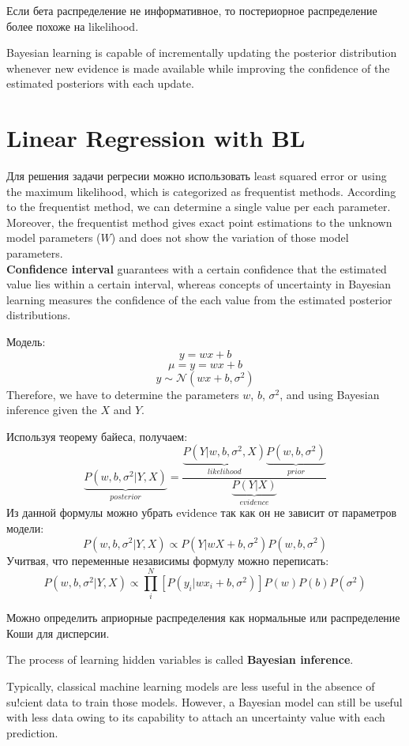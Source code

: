 \documentclass{book}
\begin{document}
Если бета распределение не информативное, то постериорное распределение более похоже на likelihood.

Bayesian learning is capable of incrementally updating the
posterior distribution whenever new evidence is made available while
improving the confidence of the estimated posteriors with each
update.

\section{Linear Regression with BL}

Для решения задачи регресии можно использовать least squared error or using the maximum likelihood, which is
categorized as frequentist methods. According to the frequentist method, we can determine a single value
per each parameter.
Moreover, the frequentist method gives exact point estimations to
the unknown model parameters ($W$) and does not show the
variation of those model parameters.\\
\textbf{Confidence interval}  guarantees with a certain confidence that the estimated value lies within a certain
interval, whereas concepts of uncertainty in Bayesian learning
measures the confidence of the each value from the estimated
posterior distributions.

Модель:$$y = wx+b$$ $$\mu = y = wx+b$$ $$y \sim \mathcal{N}(wx+b, \sigma^2)$$
Therefore, we have to
determine the parameters $w$, $b$, $\sigma^2$, and using Bayesian inference given
the $X$ and $Y$.

Используя теорему байеса, получаем:
$$\underbrace{P(w,b,\sigma^2|Y,X)}_{posterior} = \frac{\underbrace{P(Y|w,b,\sigma^2, X)}_{likelihood}\underbrace{P(w,b,\sigma^2)}_{prior}}{\underbrace{P(Y|X)}_{evidence}}$$
Из данной формулы можно убрать evidence так как он не зависит от параметров модели:
$$P(w,b,\sigma^2|Y,X)\propto P(Y|wX+b,\sigma^2)P(w,b,\sigma^2)$$
Учитвая, что переменные независимы формулу можно переписать:
$$P(w,b,\sigma^2|Y,X)\propto \prod_i^N[P(y_i|wx_i+b,\sigma^2)]P(w)P(b)P(\sigma^2)$$

 Можно определить априорные распределения как нормальные или распределение Коши для дисперсии.
 
The process of learning hidden variables is called \textbf{Bayesian
inference}.

Typically, classical machine learning models are less useful in the
absence of su!cient data to train those models. However, a Bayesian
model can still be useful with less data owing to its capability to attach
an uncertainty value with each prediction.
\end{document}
